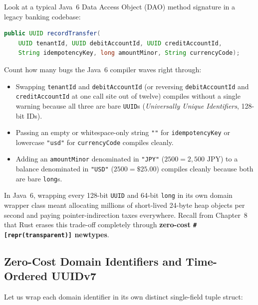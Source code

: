Look at a typical Java~6 Data Access Object (DAO) method signature in a legacy banking codebase:
\begin{lstlisting}[language=Java]
public UUID recordTransfer(
    UUID tenantId, UUID debitAccountId, UUID creditAccountId,
    String idempotencyKey, long amountMinor, String currencyCode);
\end{lstlisting}
Count how many bugs the Java~6 compiler waves right through:
\begin{itemize}
  \item Swapping \texttt{tenantId} and \texttt{debitAccountId} (or reversing \texttt{debitAccountId} and \texttt{creditAccountId} at one call site out of twelve) compiles without a single warning because all three are bare \texttt{UUID}s (\emph{Universally Unique Identifiers}, 128-bit IDs).
  \item Passing an empty or whitespace-only string \texttt{""} for \texttt{idempotencyKey} or lowercase \texttt{"usd"} for \texttt{currencyCode} compiles cleanly.
  \item Adding an \texttt{amountMinor} denominated in \texttt{"JPY"} ($2500 = 2{,}500\text{ JPY}$) to a balance denominated in \texttt{"USD"} ($2500 = \$25.00$) compiles cleanly because both are bare \texttt{long}s.
\end{itemize}

In Java~6, wrapping every 128-bit \texttt{UUID} and 64-bit \texttt{long} in its own domain wrapper class meant allocating millions of short-lived 24-byte heap objects per second and paying pointer-indirection taxes everywhere. Recall from Chapter~8 that Rust erases this trade-off completely through \textbf{zero-cost \texttt{\#[repr(transparent)]} newtypes}.

\subsection{Zero-Cost Domain Identifiers and Time-Ordered UUIDv7}

Let us wrap each domain identifier in its own distinct single-field tuple struct:

